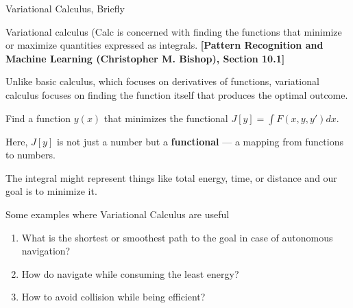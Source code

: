 \documentclass[aspectratio=169,xcolor=dvipsnames,svgnames,x11names,fleqn]{beamer}
\begin{document}
\begin{frame}{Variational Calculus, Briefly}

\footnotesize


\begin{tcolorbox}[vcLight]
\scriptsize
  Variational calculus (Calc is concerned with finding the functions that minimize
  or maximize quantities expressed as integrals. \textbf{[Pattern Recognition and Machine Learning (Christopher M. Bishop), Section 10.1]}
\end{tcolorbox}

    \begin{tcolorbox}[vcAccent, title={\faCalculator\enspace Basic Calculus}]
      \color{vcSilver}
      Unlike basic calculus, which focuses on derivatives of functions, variational calculus focuses on finding the function itself that produces the optimal outcome.

    \end{tcolorbox}


\vspace{6pt}

\begin{tcolorbox}[vcHighlight, title={\color{vcDeep}\bfseries\small In Variational Calculus, }]
  Find a function $y(x)$ that minimizes the functional  $J[y] = \int F(x, y, y') dx$.
  
  Here, $J[y]$ is not just a number but a \textbf{functional} —
  a mapping from functions to numbers.
\end{tcolorbox}

{\small\color{vcMid}%
The integral might represent things like total energy, time, or distance and our goal is to minimize it.}


\end{frame}


\begin{frame}{Some examples where Variational Calculus are useful}

\begin{enumerate}
\item What is the shortest or smoothest path to the goal in case of autonomous navigation?

\item How do navigate while consuming the least energy?

\item How to avoid collision while being efficient?
\end{enumerate}


\end{frame}
\end{document}
